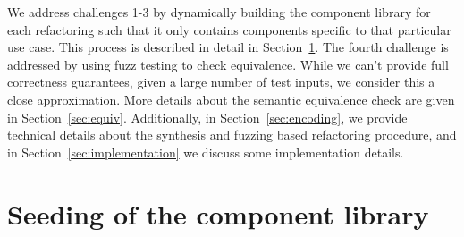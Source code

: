 \documentclass[10pt,conference]{IEEEtran}
\begin{document}
We address challenges 1-3 by dynamically building the component library for each refactoring
such that it only contains components specific to that particular use case.
This process is described in detail in Section~\ref{sec:components-seeding}.
The fourth challenge is addressed
by using fuzz testing to check equivalence. %
While we can't provide full correctness guarantees,
given a large number of test inputs, we consider this a close approximation.
More details about the semantic equivalence check are given in Section~\ref{sec:equiv}.
Additionally, in Section~\ref{sec:encoding}, we provide technical details about the synthesis and fuzzing based refactoring procedure, 
and in Section~\ref{sec:implementation} we discuss some implementation details.




\section{Seeding of the component library} \label{sec:components-seeding}
\end{document}
